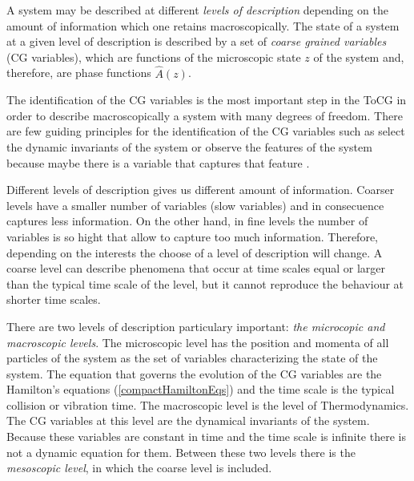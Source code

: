 \documentclass[b5paper,openright,11pt]{book}
\begin{document}
A system may be described at different {\it levels of description} depending on the amount of information which one retains macroscopically. The state of a system at a given level of description is described by a set of {\it coarse grained variables} (CG variables), which are functions of the microscopic state $z$ of the system and, therefore, are phase functions $\hat{A}(z)$. 

The identification of the CG variables is the most important step in the ToCG in order to describe macroscopically a system with many degrees of freedom. There are few guiding principles for the identification of the CG variables such as select the dynamic invariants of the system or observe the features of the system because maybe there is a variable that captures that feature \cite{Karttunen2004}.

Different levels of description gives us different amount of information. Coarser levels have a smaller number of variables (slow variables) and in consecuence captures less information. On the other hand, in fine levels the number of variables is so hight that allow to capture too much information. Therefore, depending on the interests the choose of a level of description will change. A coarse level can describe phenomena that occur at time scales equal or larger than the typical time scale of the level, but it cannot reproduce the behaviour at shorter time scales.

There are two levels of description particulary important: {\it the microcopic and macroscopic levels}. 
The microscopic level has the position and momenta of all particles of the system as the set of variables characterizing the state of the system. 
The equation that governs the evolution of the CG variables are the Hamilton's equations (\ref{compactHamiltonEqs}) and the time scale is the typical collision or vibration time. 
The macroscopic level is the level of Thermodynamics. The CG variables at this level are the dynamical invariants of the system. Because these variables are constant in time and the time scale is infinite there is not a dynamic equation for them.  %
Between these two levels there is the {\it mesoscopic level}, in which the coarse level is included.
\end{document}
